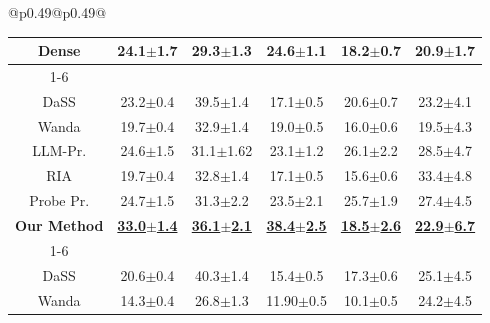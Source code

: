 \begin{table}[!t]
\begin{tabular}{@{}p{}@{}p{}@{}}
{\begin{tabular}{c c c c c c}
\midrule
\rowcolor{white} Dense & 24.1{\scriptsize$\pm$1.7} & 29.3{\scriptsize$\pm$1.3} & 24.6{\scriptsize$\pm$1.1} & 18.2{\scriptsize$\pm$0.7} & 20.9{\scriptsize$\pm$1.7} \\
\cmidrule(lr){1-6}
\rowcolor{lightgray} \multicolumn{6}{c}{\rule{0pt}{2.2ex}\textbf{Light Pruning}\rule[-0.8ex]{0pt}{0pt}} \\
DaSS & 23.2{\scriptsize$\pm$0.4} & 39.5{\scriptsize$\pm$1.4} & 17.1{\scriptsize$\pm$0.5} & 20.6{\scriptsize$\pm$0.7} & 23.2{\scriptsize$\pm$4.1} \\
Wanda & 19.7{\scriptsize$\pm$0.4} & 32.9{\scriptsize$\pm$1.4} & 19.0{\scriptsize$\pm$0.5} & 16.0{\scriptsize$\pm$0.6} & 19.5{\scriptsize$\pm$4.3} \\
LLM-Pr. & 24.6{\scriptsize$\pm$1.5} & 31.1{\scriptsize$\pm$1.62} & 23.1{\scriptsize$\pm$1.2} & 26.1{\scriptsize$\pm$2.2} & 28.5{\scriptsize$\pm$4.7} \\
RIA & 19.7{\scriptsize$\pm$0.4} & 32.8{\scriptsize$\pm$1.4} & 17.1{\scriptsize$\pm$0.5} & 15.6{\scriptsize$\pm$0.6} & 33.4{\scriptsize$\pm$4.8} \\
Probe Pr. & 24.7{\scriptsize$\pm$1.5} & 31.3{\scriptsize$\pm$2.2} & 23.5{\scriptsize$\pm$2.1} & 25.7{\scriptsize$\pm$1.9} & 27.4{\scriptsize$\pm$4.5} \\
\rowcolor{icmlblue} \textbf{Our Method} & \textbf{\underline{33.0{\scriptsize$\pm$1.4}}} & \textbf{\underline{36.1{\scriptsize$\pm$2.1}}} & \textbf{\underline{38.4{\scriptsize$\pm$2.5}}} & \textbf{\underline{18.5{\scriptsize$\pm$2.6}}} & \textbf{\underline{22.9{\scriptsize$\pm$6.7}}} \\
\cmidrule(lr){1-6}
\rowcolor{lightgray} \multicolumn{6}{c}{\rule{0pt}{2.2ex}\textbf{Heavy Pruning}\rule[-0.8ex]{0pt}{0pt}} \\
DaSS & 20.6{\scriptsize$\pm$0.4} & 40.3{\scriptsize$\pm$1.4} & 15.4{\scriptsize$\pm$0.5} & 17.3{\scriptsize$\pm$0.6} & 25.1{\scriptsize$\pm$4.5} \\
Wanda & 14.3{\scriptsize$\pm$0.4} & 26.8{\scriptsize$\pm$1.3} & 11.90{\scriptsize$\pm$0.5} & 10.1{\scriptsize$\pm$0.5} & 24.2{\scriptsize$\pm$4.5} \\

\end{tabular}}
\end{tabular}
\end{table}

